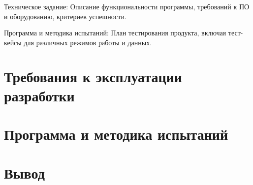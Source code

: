 Техническое задание:
Описание функциональности программы, требований к ПО
и оборудованию, критериев успешности.

Программа и методика испытаний:
План тестирования продукта,
включая тест-кейсы для различных режимов работы и данных.

\section{Требования к эксплуатации разработки}


\section{Программа и методика испытаний}


\clearpage

\section*{\LARGE Вывод}

